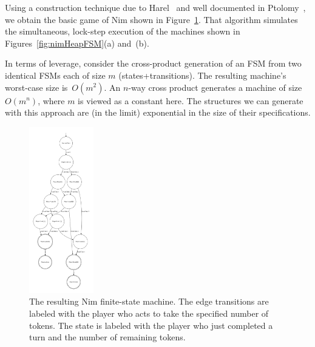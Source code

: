 \documentclass[conference]{IEEEtran}
\begin{document}


Using a construction technique due to Harel~\cite{HAREL1987231} and well documented in Ptolomy~\cite{EdwardLee}, we obtain the basic game of Nim shown in Figure~\ref{fig:nimFSM}.  That algorithm simulates the simultaneous, lock-step execution of the machines shown in Figures~\ref{fig:nimHeapFSM}(a) and~(b).

In terms of leverage, consider the cross-product generation of an FSM from two identical FSMs each of size $m$ (states+transitions).  The resulting machine's worst-case size is~$O(m^{2})$.  An $n$-way cross product generates a machine of size $O(m^{n})$, where $m$ is viewed as a constant here.  The structures we can generate with this approach are (in the limit) exponential in the size of their specifications.

\begin{figure}
    \centering
    \includegraphics[width=0.25\textwidth]{figures/nimexample/nimFSM.pdf}
    \caption{The resulting Nim finite-state machine.  The edge transitions are labeled with the player who acts to take the specified number of tokens. The state is labeled with the player who just completed a turn and the number of remaining tokens.}
    \label{fig:nimFSM}
\end{figure}
\end{document}
